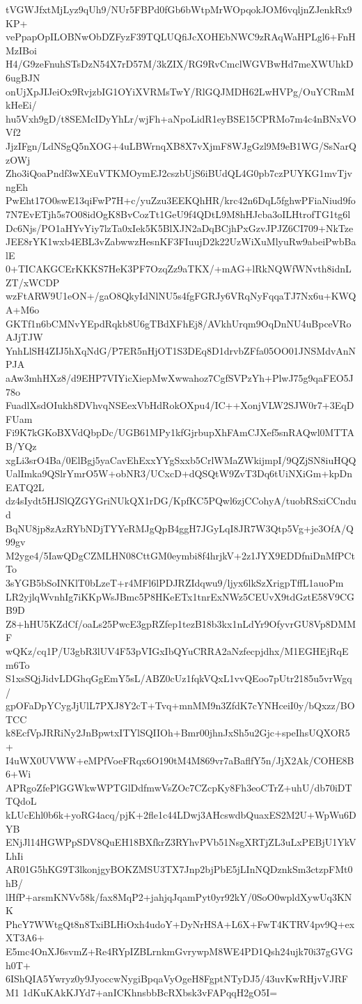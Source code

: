 tVGWJfxtMjLyz9qUh9/NUr5FBPd0fGb6bWtpMrWOpqokJOM6vqljnZJenkRx9KP+
vePpapOpILOBNwObDZFyzF39TQLUQfiJcXOHEbNWC9zRAqWaHPLgl6+FnHMzIBoi
H4/G9zeFnuhSTsDzN54X7rD57M/3kZIX/RG9RvCmclWGVBwHd7meXWUhkD6ugBJN
onUjXpJIJeiOx9RvjzbIG1OYiXVRMsTwY/RlGQJMDH62LwHVPg/OuYCRmMkHeEi/
hu5Vxh9gD/t8SEMcIDyYhLr/wjFh+aNpoLidR1eyBSE15CPRMo7m4c4nBNxVOVf2
JjzIFgn/LdNSgQ5nXOG+4uLBWrnqXB8X7vXjmF8WJgGzl9M9eB1WG/SsNarQzOWj
Zho3iQoaPndf3wXEuVTKMOymEJ2cszbUjS6iBUdQL4G0pb7czPUYKG1mvTjvngEh
PwEht17O0swE13qiFwP7H+c/yuZzu3EEKQhHR/krc42n6DqL5fghwPFiaNiud9fo
7N7EvETjh5s7O08idOgK8BvCozTt1GeU9f4QDtL9M8hHJcba3oILHtrofTG1tg6l
Dc6Njs/PO1aHYvYiy7lzTa0xIek5K5BlXJN2aDqBCjhPxGzvJPJZ6CI709+NkTze
JEE8rYK1wxb4EBL3vZabwwzHesnKF3FIuujD2k22UzWiXuMlyuRw9abeiPwbBalE
0+TICAKGCErKKKS7HeK3PF7OzqZz9aTKX/+mAG+lRkNQWfWNvth8idnLZT/xWCDP
wzFtARW9U1eON+/gaO8QkyIdNlNU5s4fgFGRJy6VRqNyFqqaTJ7Nx6u+KWQA+M6o
GKTf1n6bCMNvYEpdRqkb8U6gTBdXFhEj8/AVkhUrqm9OqDnNU4uBpceVRoAJjTJW
YnhLlSH4ZIJ5hXqNdG/P7ER5nHjOT1S3DEq8D1drvbZFfa05OO01JNSMdvAnNPJA
aAw3mhHXz8/d9EHP7VIYicXiepMwXwwahoz7CgfSVPzYh+PlwJ75g9qaFEO5J78o
FuadlXsdOIukh8DVhvqNSEexVbHdRokOXpu4/IC++XonjVLW2SJW0r7+3EqDFUam
Fi9K7kGKoBXVdQbpDc/UGB61MPy1kfGjrbupXhFAmCJXef5snRAQwl0MTTAB/YQz
xgLi3srO4Ba/0ElBgj5yaCavEhExxYYgSxxb5CrlWMaZWkijmpI/9QZjSN8iuHQQ
UalImka9QSlrYmrO5W+obNR3/UCxcD+dQSQtW9ZvT3Dq6tUiNXiGm+kpDnEATQ2L
dz4sIydt5HJSlQZGYGriNUkQX1rDG/KpfKC5PQwl6zjCCohyA/tuobRSxiCCndud
BqNU8jp8zAzRYbNDjTYYeRMJgQpB4ggH7JGyLqI8JR7W3Qtp5Vg+je3OfA/Q99gv
M2yge4/5IawQDgCZMLHN08CttGM0eymbi8f4hrjkV+2z1JYX9EDDfniDnMfPCtTo
3sYGB5bSoINKlT0bLzeT+r4MFl6lPDJRZIdqwu9/ljyx6lkSzXrigpTffL1auoPm
LR2yjlqWvnhIg7iKKpWsJBmc5P8HKeETx1tnrExNWz5CEUvX9tdGztE58V9CGB9D
Z8+hHU5KZdCf/oaLs25PwcE3gpRZfep1tezB18b3kx1nLdYr9OfyvrGU8Vp8DMMF
wQKz/cq1P/U3gbR3lUV4F53pVIGxIbQYuCRRA2aNzfecpjdhx/M1EGHEjRqEm6To
S1xsSQjJidvLDGhqGgEmY5sL/ABZ0cUz1fqkVQxL1vvQEoo7pUtr2185u5vrWgq/
gpOFaDpYCygJjUlL7PXJ8Y2cT+Tvq+mnMM9n3ZfdK7cYNHceiI0y/bQxzz/BOTCC
k8EcfVpJRRiNy2JnBpwtxITYlSQIIOh+Bmr00jhnJxSh5u2Gjc+speIhsUQXOR5+
I4uWX0UVWW+eMPfVoeFRqx6O190tM4M869vr7aBaflfY5n/JjX2Ak/COHE8B6+Wi
APRgoZfePlGGWkwWPTGlDdfmwVsZOc7CZcpKy8Fh3eoCTrZ+uhU/db70iDTTQdoL
kLUcEhl0b6k+yoRG4acq/pjK+2fle1c44LDwj3AHcswdbQuaxES2M2U+WpWu6DYB
ENjJl14HGWPpSDV8QuEH18BXfkrZ3RYhvPVb51NsgXRTjZL3uLxPEBjU1YkVLhIi
AR01G5hKG9T3lkonjgyBOKZMSU3TX7Jnp2bjPbE5jLInNQDznkSm3ctzpFMt0hB/
lHfP+arsmKNVv58k/fax8MqP2+jahjqJqamPyt0yr92kY/0SoO0wpldXywUq3KNK
PhcY7WWtgQt8n8TxiBLHiOxh4udoY+DyNrHSA+L6X+FwT4KTRV4pv9Q+exXT3A6+
E5mc4OnXJ6svmZ+Re4RYpIZBLrnkmGvrywpM8WE4PD1Qsh24ujk70i37gGVGh0T+
6IShQIA5Ywryz0y9JyoccwNygiBpqaVyOgeH8FgptNTyDJ5/43uvKwRHjvVJRFM1
1dKuKAkKJYd7+anICKhnsbbBcRXbsk3vFAPqqH2gO5I=
